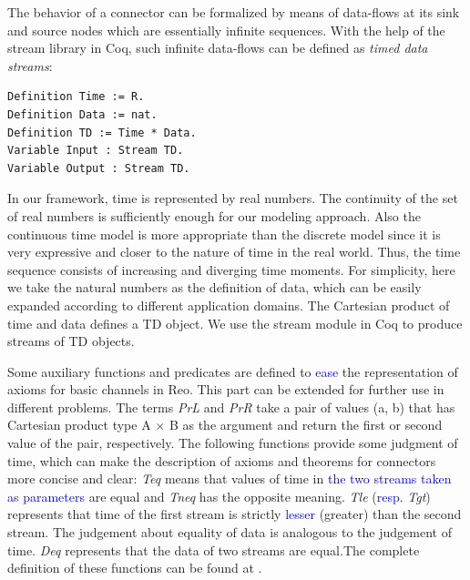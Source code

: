 \documentclass[preprint,3p]{elsarticle}
\newcommand{\liyi}[1]{\textcolor{blue}{#1}}
\newcommand{\xy}[1]{{#1}}
\begin{document}
The behavior of a connector can be formalized by means of data-flows at its sink and source nodes which are essentially infinite sequences. With the help of the stream library in Coq, such infinite data-flows can be defined as \emph{timed data streams}:
\begin{lstlisting}[language=coq]
Definition Time := R.
Definition Data := nat.
Definition TD := Time * Data.
Variable Input : Stream TD.
Variable Output : Stream TD.
\end{lstlisting}
%
In our framework, time is represented by real numbers. %
The continuity of the set of real numbers is sufficiently enough for our modeling approach. Also the
continuous time model is more appropriate than the discrete model since it is very expressive and closer to the nature of time in the real world. \xy{Thus, the time sequence consists of increasing and diverging time moments.} For simplicity, here we take the natural numbers as the definition of data, which can be easily expanded according to different application domains. The Cartesian product of time and data defines a TD object.
We use the stream module in Coq to produce streams of TD objects.

Some auxiliary functions and predicates are defined to \liyi{ease} the representation of axioms for basic channels in Reo. This part can be extended for further use in different problems.
The terms \emph{PrL} and \emph{PrR} take a pair of values (a, b) that has Cartesian product type A $\times$ B as the argument and return the first or second value of the pair, respectively.
The following functions provide some judgment of time, which can make
the description of axioms and theorems for connectors more concise and
clear: \emph{Teq} \xy{means that values of time in \liyi{the two streams taken as parameters} are equal} and \emph{Tneq} has the
opposite meaning. \emph{Tle}  (\liyi{resp.} \emph{Tgt}) represents that time of the first stream is
strictly \liyi{lesser} (greater) than the second stream. The judgement about
equality of data is analogous to the judgement of time. \xy{\emph{Deq} represents that the data of two streams are equal.}The complete
definition of these functions can be found at \cite{reo2coq2Z3}.
\end{document}
